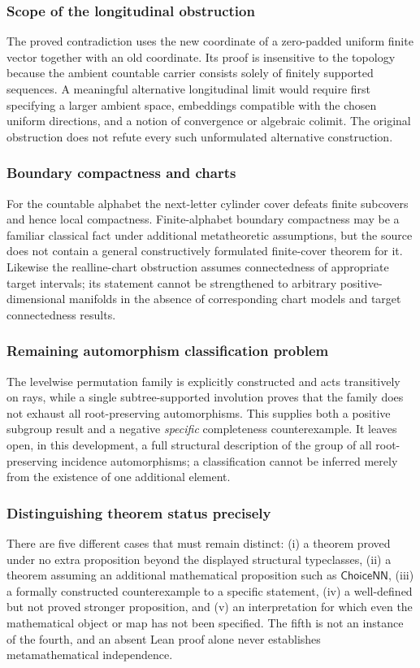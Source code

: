 \documentclass[11pt,reqno]{amsart}
\theoremstyle{definition}\newtheorem{definition}[theorem]{Definition}
\theoremstyle{remark}\newtheorem{remark}[theorem]{Remark}
\begin{document}
\medskip
\subsubsection*{Scope of the longitudinal obstruction}\label{supp:16-4}
The proved contradiction uses the new coordinate of a zero-padded uniform finite vector together with an old coordinate. Its proof is insensitive to the topology because the ambient countable carrier consists solely of finitely supported sequences. A meaningful alternative longitudinal limit would require first specifying a larger ambient space, embeddings compatible with the chosen uniform directions, and a notion of convergence or algebraic colimit. The original obstruction does not refute every such unformulated alternative construction.
\medskip
\medskip
\subsubsection*{Boundary compactness and charts}\label{supp:16-5}
For the countable alphabet the next-letter cylinder cover defeats finite subcovers and hence local compactness. Finite-alphabet boundary compactness may be a familiar classical fact under additional metatheoretic assumptions, but the source does not contain a general constructively formulated finite-cover theorem for it. Likewise the realline-chart obstruction assumes connectedness of appropriate target intervals; its statement cannot be strengthened to arbitrary positive-dimensional manifolds in the absence of corresponding chart models and target connectedness results.
\medskip
\medskip
\subsubsection*{Remaining automorphism classification problem}\label{supp:16-6}
The levelwise permutation family is explicitly constructed and acts transitively on rays, while a single subtree-supported involution proves that the family does not exhaust all root-preserving automorphisms. This supplies both a positive subgroup result and a negative \emph{specific} completeness counterexample. It leaves open, in this development, a full structural description of the group of all root-preserving incidence automorphisms; a classification cannot be inferred merely from the existence of one additional element.
\medskip


\medskip
\subsubsection*{Distinguishing theorem status precisely}\label{supp:16-7}
There are five different cases that must remain distinct: (i) a theorem proved under no extra proposition beyond the displayed structural typeclasses, (ii) a theorem assuming an additional mathematical proposition such as $\mathsf{ChoiceNN}$, (iii) a formally constructed counterexample to a specific statement, (iv) a well-defined but not proved stronger proposition, and (v) an interpretation for which even the mathematical object or map has not been specified. The fifth is not an instance of the fourth, and an absent Lean proof alone never establishes metamathematical independence.
\medskip
\end{document}
